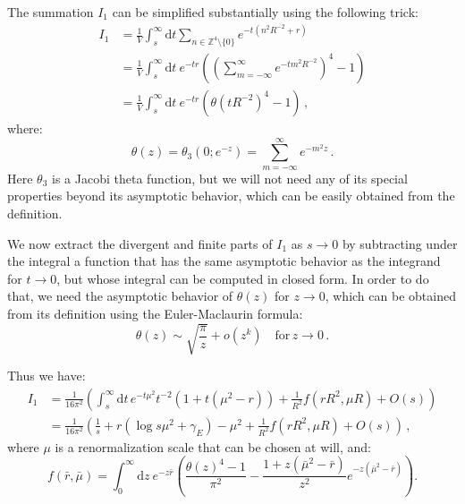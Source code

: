 \documentclass[11pt,a4paper]{article}
\newcommand{\dd}{\mathrm{d}}
\begin{document}
The summation $I_1$ can be simplified substantially using the following trick:
\begin{equation}
\begin{split}
    I_1 &= \frac{1}{V} \int_{s}^{\infty} \dd t \sum_{n\in\mathbb{Z}^4\setminus\{0\}} 
    e^{-t(n^2 R^{-2} + r)}\\
    & = \frac{1}{V} \int_{s}^{\infty} \dd t\ e^{-t r}
        \left(\left(\sum_{m = -\infty}^{\infty} e^{-t m^2 R^{-2}}\right)^4 - 1\right) \\
    & = \frac{1}{V} \int_{s}^{\infty} \dd t\ e^{-t r}
        \left(\theta\!\left(t R^{-2}\right)^4 - 1\right)\,,
\end{split}
\end{equation}
where:
\begin{equation}
    \label{eq:theta}
    \theta(z) = \theta_3(0; e^{-z}) = \sum_{m = -\infty}^{\infty} e^{-m^2 z}\,.
\end{equation}
Here $\theta_3$ is a Jacobi theta function, but we will not need any of
its special properties beyond its asymptotic behavior, which can be easily
obtained from the definition.

We now extract the divergent and finite parts of $I_1$ as $s\to 0$ by
subtracting under the integral a function that has the same asymptotic behavior
as the integrand for $t \to 0$, but whose integral can be computed in closed
form. In order to do that, we need the asymptotic behavior of $\theta(z)$ for
$z\to0$, which can be obtained from its definition using the Euler-Maclaurin
formula:
\begin{equation}
    \theta(z) \sim \sqrt{\frac{\pi}{z}} + o(z^k) \quad\mathrm{for}\, z\to0\,.
\end{equation}

Thus we have:
\begin{equation}
\begin{split}
    I_1 &= \frac{1}{16\pi^2}\left(\int_{s}^{\infty}\dd t\, e^{-t \mu^2} t^{-2}\left(1 + t (\mu^2 - r)\right)
    +\frac{1}{R^2} f(r R^2, \mu R) + O(s)\right)\\
    &= \frac{1}{16\pi^2}\left(\frac{1}{s} + r\left(\log s\mu^2 + \gamma_{E}\right) - 
    \mu^2 +\frac{1}{R^2} f(r R^2, \mu R) + O(s)\right)\,,
\end{split}
\end{equation}
where $\mu$ is a renormalization scale that can be chosen at will, and:
\begin{equation}
    \label{eq:f_definition}
    f(\bar{r},\bar{\mu}) = \int_{0}^{\infty} \dd z\ e^{-z \bar{r}} \left(\frac{\theta(z)^4 - 1}{\pi^2} - 
    \frac{1 + z\left(\bar{\mu}^2 - \bar{r}\right)}{z^2}e^{-z\left(\bar{\mu}^2 - \bar{r}\right)}\right).
\end{equation}
\end{document}
